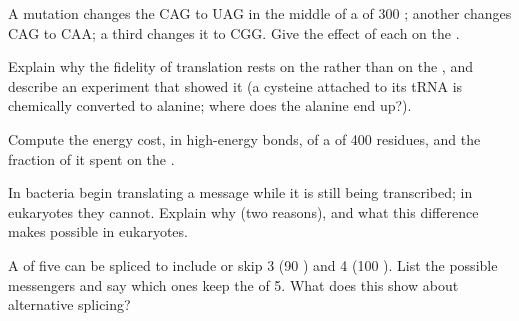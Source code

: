 \begin{exercise}[$\star\star$]\label{exo:b1:gene-expression:7}
A mutation changes the  CAG to UAG in the middle of a  of
\qty{300}{} ; another changes CAG to CAA; a third changes it to
CGG. Give the effect of each on the .
\end{exercise}

\begin{exercise}[$\star\star$]\label{exo:b1:gene-expression:8}
Explain why the fidelity of translation rests on the  rather than on the , and describe an experiment
that showed it (a cysteine attached to its tRNA is chemically
converted to alanine; where does the alanine end up?).
\end{exercise}

\begin{exercise}[$\star\star$]\label{exo:b1:gene-expression:9}
Compute the energy cost, in high-energy bonds, of a  of
\qty{400}{} residues, and the fraction of it spent on the .
\end{exercise}

\begin{exercise}[$\star\star\star$]\label{exo:b1:gene-expression:10}
In bacteria  begin translating a message while it is still
being transcribed; in eukaryotes they cannot. Explain why (two
reasons), and what this difference makes possible in eukaryotes.
\end{exercise}

\begin{exercise}[$\star\star\star$]\label{exo:b1:gene-expression:11}
A  of five  can be spliced to include or skip  3
(\qty{90}{} ) and  4 (\qty{100}{} ). List
the possible messengers and say which ones keep the  of
 5. What does this show about alternative splicing?
\end{exercise}

